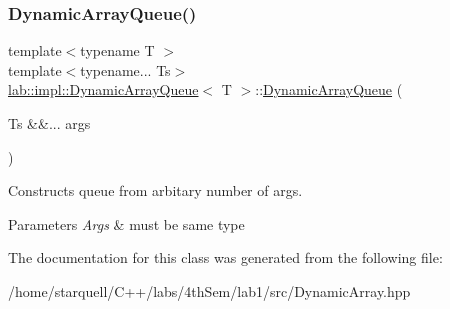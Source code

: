 \subsubsection{\texorpdfstring{Dynamic\+Array\+Queue()}{DynamicArrayQueue()}}
{\footnotesize\ttfamily template$<$typename T $>$ \\
template$<$typename... Ts$>$ \\
\hyperlink{classlab_1_1impl_1_1DynamicArrayQueue}{lab\+::impl\+::\+Dynamic\+Array\+Queue}$<$ T $>$\+::\hyperlink{classlab_1_1impl_1_1DynamicArrayQueue}{Dynamic\+Array\+Queue} (\begin{DoxyParamCaption}\item[{Ts \&\&...}]{args }\end{DoxyParamCaption})}



Constructs queue from arbitary number of args. 


\begin{DoxyParams}{Parameters}
{\em Args} & must be same type \\
\hline
\end{DoxyParams}


The documentation for this class was generated from the following file\+:\begin{DoxyCompactItemize}
\item 
/home/starquell/\+C++/labs/4th\+Sem/lab1/src/Dynamic\+Array.\+hpp\end{DoxyCompactItemize}

